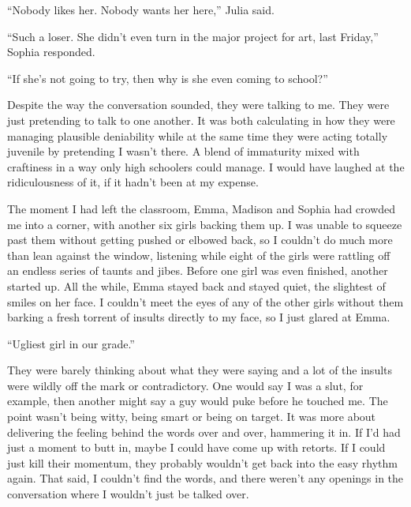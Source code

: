 





``Nobody likes her.  Nobody wants her here,'' Julia said.



``Such a loser.  She didn't even turn in the major project for art, last Friday,'' Sophia responded.



``If she's not going to try, then why is she even coming to school?''



Despite the way the conversation sounded, they were talking to me.  They were just pretending to talk to one another.  It was both calculating in how they were managing plausible deniability while at the same time they were acting totally juvenile by pretending I wasn't there.  A blend of immaturity mixed with craftiness in a way only high schoolers could manage.  I would have laughed at the ridiculousness of it, if it hadn't been at my expense.



The moment I had left the classroom, Emma, Madison and Sophia had crowded me into a corner, with another six girls backing them up.  I was unable to squeeze past them without getting pushed or elbowed back, so I couldn't do much more than lean against the window, listening while eight of the girls were rattling off an endless series of taunts and jibes.  Before one girl was even finished, another started up.  All the while, Emma stayed back and stayed quiet, the slightest of smiles on her face.  I couldn't meet the eyes of any of the other girls without them barking a fresh torrent of insults directly to my face, so I just glared at Emma.



``Ugliest girl in our grade.''



They were barely thinking about what they were saying and a lot of the insults were wildly off the mark or contradictory.  One would say I was a slut, for example, then another might say a guy would puke before he touched me.  The point wasn't being witty, being smart or being on target.  It was more about delivering the feeling behind the words over and over, hammering it in.  If I'd had just a moment to butt in, maybe I could have come up with retorts.  If I could just kill their momentum, they probably wouldn't get back into the easy rhythm again.  That said, I couldn't find the words, and there weren't any openings in the conversation where I wouldn't just be talked over.



